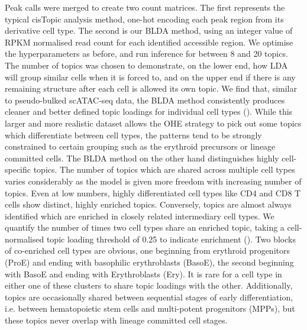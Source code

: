 Peak calls were merged to create two count matrices. The first represents the typical cisTopic analysis method, one-hot encoding each peak region from its derivative cell type. The second is our BLDA method, using an integer value of RPKM normalised read count for each identified accessible region. We optimise the hyperparameters as before, and run inference for between 8 and 20 topics. The number of topics was chosen to demonstrate, on the lower end, how LDA will group similar cells when it is forced to, and on the upper end if there is any remaining structure after each cell is allowed its own topic. We find that, similar to pseudo-bulked scATAC-seq data, the BLDA method consistently produces cleaner and better defined topic loadings for individual cell types (). While this larger and more realistic dataset allows the OHE strategy to pick out some topics which differentiate between cell types, the patterns tend to be strongly constrained to certain grouping such as the erythroid precursors or lineage committed cells. The BLDA method on the other hand distinguishes highly cell-specific topics. The number of topics which are shared across multiple cell types varies considerably as the model is given more freedom with increasing number of topics. Even at low numbers, highly differentiated cell types like CD4 and CD8 T cells show distinct, highly enriched topics. Conversely, topics are almost always identified which are enriched in closely related intermediary cell types. We quantify the number of times two cell types share an enriched topic, taking a cell-normalised topic loading threshold of 0.25 to indicate enrichment (). Two blocks of co-enriched cell types are obvious, one beginning from erythroid progenitors (ProE) and ending with basophilic erythroblasts (BasoE), the second beginning with BasoE and ending with Erythroblasts (Ery). It is rare for a cell type in either one of these clusters to share topic loadings with the other. Additionally, topics are occasionally shared between sequential stages of early differentiation, i.e. between hematopoietic stem cells and multi-potent progenitors (MPPs), but these topics never overlap with lineage committed cell stages.  


